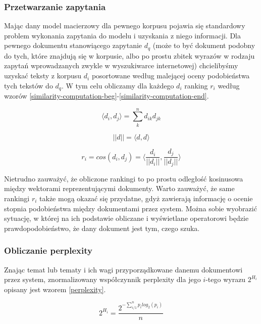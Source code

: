 \documentclass[11pt,a4paper]{article}
\begin{document}
\subsubsection{Przetwarzanie zapytania}
\label{processing}

Mając dany model macierzowy dla pewnego korpusu pojawia się standardowy problem
wykonania zapytania do modelu i uzyskania z niego informacji. Dla pewnego
dokumentu stanowiącego zapytanie $d_q$ (może to być dokument podobny do tych,
które znajdują się w korpusie, albo po prostu zbitek wyrazów w rodzaju zapytań
wprowadzanych zwykle w wyszukiwarce internetowej) chcielibyśmy uzyskać teksty z
korpusu $d_i$ posortowane według malejącej oceny podobieństwa tych tekstów do
$d_q$. W tym celu obliczamy dla każdego $d_i$ ranking $r_i$ według wzorów
\ref{similarity-computation-beg}-\ref{similarity-computation-end}.

\begin{equation}
\label{similarity-computation-beg}
  \langle d_i, d_j \rangle = \sum_k^n d_{ik}d_{jk}
\end{equation}

\begin{equation}
  ||d|| = \langle d, d \rangle
\end{equation}

\begin{equation}
  \label{similarity-computation-end}
  r_i = cos(d_i, d_j) = \langle \frac{d_i}{||d_i||}, \frac{d_j}{||d_j||} \rangle
\end{equation}

Nietrudno zauważyć, że obliczone rankingi to po prostu odległość kosinusowa
między wektorami reprezentującymi dokumenty.  Warto zauważyć, że same rankingi
$r_i$ także mogą okazać się przydatne, gdyż zawierają informację o ocenie
stopnia podobieństwa między dokumentami przez system. Można sobie wyobrazić
sytuację, w której na ich podstawie obliczane i wyświetlane operatorowi będzie
prawdopodobieństwo, że dany dokument jest tym, czego szuka.

\subsubsection{Obliczanie perplexity}

Znając temat lub tematy i ich wagi przyporządkowane danemu dokumentowi przez
system, znormalizowany współczynnik perplexity dla jego $i$-tego wyrazu
$2^{H_i}$ opisany jest wzorem \ref{perplexity}.

\begin{equation}
  \label{perplexity}
  2^{H_i} = \frac{2^{-\sum_{i/1}^n p_ilog_2(p_i)}}{n}
\end{equation}
\end{document}
